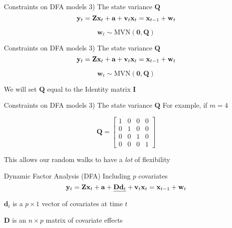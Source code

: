 \documentclass[
  ignorenonframetext,
]{beamer}
\begin{document}
\begin{frame}{Constraints on DFA models \textbar{} 3) The state variance
\(\mathbf{Q}\)}
\protect\hypertarget{constraints-on-dfa-models-3-the-state-variance-mathbfq}{}
\[
\mathbf{y}_t = \mathbf{Z} \mathbf{x}_t + \mathbf{a} + \mathbf{v}_t \\
\mathbf{x}_t = \mathbf{x}_{t-1} + \mathbf{w}_t
\]

\[
\mathbf{w}_t \sim \text{MVN}(\mathbf{0}, \mathbf{Q})
\]
\end{frame}

\begin{frame}{Constraints on DFA models \textbar{} 3) The state variance
\(\mathbf{Q}\)}
\protect\hypertarget{constraints-on-dfa-models-3-the-state-variance-mathbfq-1}{}
\[
\mathbf{y}_t = \mathbf{Z} \mathbf{x}_t + \mathbf{a} + \mathbf{v}_t \\
\mathbf{x}_t = \mathbf{x}_{t-1} + \mathbf{w}_t
\]

\[
\mathbf{w}_t \sim \text{MVN}(\mathbf{0}, \mathbf{Q})
\]

We will set \(\mathbf{Q}\) equal to the Identity matrix \(\mathbf{I}\)
\end{frame}

\begin{frame}{Constraints on DFA models \textbar{} 3) The state variance
\(\mathbf{Q}\)}
\protect\hypertarget{constraints-on-dfa-models-3-the-state-variance-mathbfq-2}{}
For example, if \(m = 4\)

\[
\mathbf{Q} =
\begin{bmatrix}
 1 & 0 & 0 & 0 \\
 0 & 1 & 0 & 0 \\
 0 & 0 & 1 & 0 \\
 0 & 0 & 0 & 1
\end{bmatrix}
\]

This allows our random walks to have a \emph{lot} of flexibility
\end{frame}

\begin{frame}{Dynamic Factor Analysis (DFA) \textbar{} Including \(p\)
covariates}
\protect\hypertarget{dynamic-factor-analysis-dfa-including-p-covariates}{}
\[
\mathbf{y}_t = \mathbf{Z} \mathbf{x}_t + \mathbf{a} + \underline{\mathbf{D} \mathbf{d}_t} + \mathbf{v}_t \\
\mathbf{x}_t = \mathbf{x}_{t-1} + \mathbf{w}_t
\]

\(\mathbf{d}_t\) is a \(p \times 1\) vector of covariates at time \(t\)

\(\mathbf{D}\) is an \(n \times p\) matrix of covariate effects
\end{frame}
\end{document}
